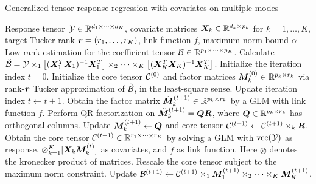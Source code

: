 \documentclass{article}
\begin{document}
\begin{algorithm}[t]
\caption{Generalized tensor response regression with covariates on multiple modes}\label{alg:B}
\begin{algorithmic}[1]
\INPUT Response tensor $\mathcal{Y}\in \mathbb{R}^{d_1\times \cdots \times d_K}$, covariate matrices $\bm X_k\in\mathbb{R}^{d_k\times p_k}$ for $k=1,\ldots,K$, target Tucker rank $\bm{r}=(r_1,\ldots,r_K)$, link function $f$, maximum norm bound $\alpha$
\OUTPUT Low-rank estimation for the coefficient tensor $\mathcal{B}\in\mathbb{R}^{p_1\times \cdots\times p_K}$. 
\State Calculate $\check {\mathcal{B}}=\mathcal{Y}\times_1 \left[(\bm X_1^T\bm X_1)^{-1}\bm X^T_1\right] \times_2\cdots\times_K\left[(\bm X_K^T\bm X_K)^{-1}\bm X^T_K\right] $.
\State Initialize the iteration index $t=0$. Initialize the core tensor $\mathcal{C}^{(0)}$ and factor matrices $\bm M^{(0)}_k\in\mathbb{R}^{p_k\times r_k}$ via rank-$\bm{r}$ Tucker approximation of $\check{\mathcal{B}}$, in the least-square sense. 
\State Update iteration index $t \leftarrow t+1$.
\State Obtain the factor matrix $\tilde {\bm M}_k^{(t+1)}\in\mathbb{R}^{p_k\times r_k}$ by a GLM with link function $f$. 
\State Perform QR factorization on $\tilde {\bm M}_k^{(t+1)}=\bm{Q}\bm{R}$, where $\bm{Q}\in\mathbb{R}^{p_k\times r_k}$ has orthogonal columns. 
\State Update $\bm M_k^{(t+1)}\leftarrow \bm{Q}$ and core tensor $\mathcal{C}^{(t+1)}\leftarrow \mathcal{C}^{(t+1)}\times_k \bm{R}$.
\EndFor
\State Obtain the core tensor $\mathcal{C}^{(t+1)}\in\mathbb{R}^{r_1\times\cdots\times r_K}$ by solving a GLM with $\text{vec}(\mathcal{Y})$ as response, $\otimes_{k=1}^K[ \bm X_k\bm M^{(t)}_k]$ as covariates, and $f$ as link function. Here $\otimes$ denotes the kronecker product of matrices. 
\State Rescale the core tensor subject to the maximum norm constraint. 
\State Update $\mathcal{B}^{(t+1)}\leftarrow \mathcal{C}^{(t+1)}\times_1\bm M_1^{(t+1)}\times_2\cdots\times_K\bm M_K^{(t+1)}$.
\EndWhile
\end{algorithmic}
\end{algorithm}
\end{document}
